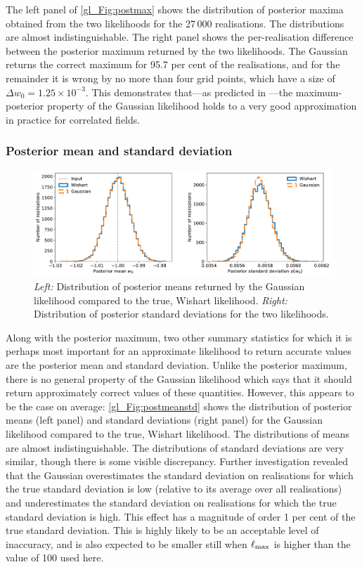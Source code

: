 The left panel of \autoref{gl_Fig:postmax} shows the distribution of posterior maxima obtained from the two likelihoods for the 27\,000 realisations. The distributions are almost indistinguishable. The right panel shows the per-realisation difference between the posterior maximum returned by the two likelihoods. The Gaussian returns the correct maximum for 95.7 per cent of the realisations, and for the remainder it is wrong by no more than four grid points, which have a size of $\Delta w_0 = 1.25 \times 10^{-3}$. This demonstrates that---as predicted in \citet{Hamimeche2008}---the maximum-posterior property of the Gaussian likelihood holds to a very good approximation in practice for correlated fields.

\subsubsection{Posterior mean and standard deviation}

\begin{figure}
\centering
\includegraphics[width=\textwidth]{postmeanstd}
\caption{\textit{Left:} Distribution of posterior means returned by the Gaussian likelihood compared to the true, Wishart likelihood. \textit{Right:} Distribution of posterior standard deviations for the two likelihoods.}
\label{gl_Fig:postmeanstd}
\end{figure}

Along with the posterior maximum, two other summary statistics
for which it is perhaps most important for an approximate likelihood to return accurate values are the posterior mean and standard deviation. Unlike the posterior maximum, there is no general property of the Gaussian likelihood which says that it should return approximately correct values of these quantities. However, this appears to be the case on average: \autoref{gl_Fig:postmeanstd} shows the distribution of posterior means (left panel) and standard deviations (right panel) for the Gaussian likelihood compared to the true, Wishart likelihood. The distributions of means are almost indistinguishable. The distributions of standard deviations are very similar, though there is some visible discrepancy. Further investigation revealed that the Gaussian overestimates the standard deviation on realisations for which the true standard deviation is low (relative to its average over all realisations) and underestimates the standard deviation on realisations for which the true standard deviation is high. This effect has a magnitude of order 1 per cent of the true standard deviation. This is highly likely to be an acceptable level of inaccuracy, and is also expected to be smaller still when $\ell_\text{max}$ is higher than the value of 100 used here.

